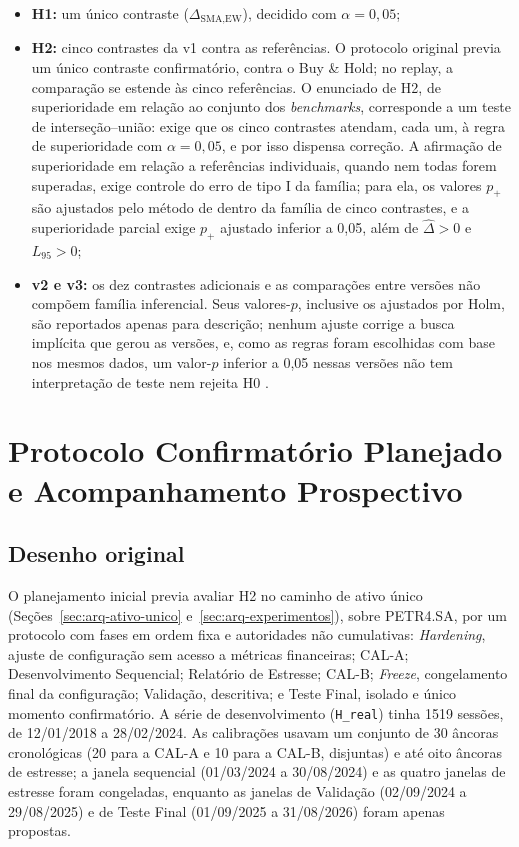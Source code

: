 \documentclass{eic-bcc-tcc}
\begin{document}
\begin{itemize}
    \item \textbf{H1:} um único contraste ($\Delta_{\text{SMA},\text{EW}}$), decidido com $\alpha = 0{,}05$;
    \item \textbf{H2:} cinco contrastes da v1 contra as referências. O protocolo original previa um único contraste confirmatório, contra o Buy \& Hold; no replay, a comparação se estende às cinco referências. O enunciado de H2, de superioridade em relação ao conjunto dos \textit{benchmarks}, corresponde a um teste de interseção--união: exige que os cinco contrastes atendam, cada um, à regra de superioridade com $\alpha = 0{,}05$, e por isso dispensa correção. A afirmação de superioridade em relação a referências individuais, quando nem todas forem superadas, exige controle do erro de tipo I da família; para ela, os valores $p_{+}$ são ajustados pelo método de \citet{Holm1979} dentro da família de cinco contrastes, e a superioridade parcial exige $p_{+}$ ajustado inferior a 0,05, além de $\hat{\Delta} > 0$ e $L_{95} > 0$;
    \item \textbf{v2 e v3:} os dez contrastes adicionais e as comparações entre versões não compõem família inferencial. Seus valores-$p$, inclusive os ajustados por Holm, são reportados apenas para descrição; nenhum ajuste corrige a busca implícita que gerou as versões, e, como as regras foram escolhidas com base nos mesmos dados, um valor-$p$ inferior a 0,05 nessas versões não tem interpretação de teste nem rejeita H0 \citep{White2000, Bailey2017}.
\end{itemize}


\section{Protocolo Confirmatório Planejado e Acompanhamento Prospectivo}
\label{sec:met-protocolo}

\subsection{Desenho original}

O planejamento inicial previa avaliar H2 no caminho de ativo único (Seções~\ref{sec:arq-ativo-unico} e~\ref{sec:arq-experimentos}), sobre PETR4.SA, por um protocolo com fases em ordem fixa e autoridades não cumulativas: \textit{Hardening}, ajuste de configuração sem acesso a métricas financeiras; CAL-A; Desenvolvimento Sequencial; Relatório de Estresse; CAL-B; \textit{Freeze}, congelamento final da configuração; Validação, descritiva; e Teste Final, isolado e único momento confirmatório. A série de desenvolvimento (\texttt{H\_real}) tinha 1519 sessões, de 12/01/2018 a 28/02/2024. As calibrações usavam um conjunto de 30 âncoras cronológicas (20 para a CAL-A e 10 para a CAL-B, disjuntas) e até oito âncoras de estresse; a janela sequencial (01/03/2024 a 30/08/2024) e as quatro janelas de estresse foram congeladas, enquanto as janelas de Validação (02/09/2024 a 29/08/2025) e de Teste Final (01/09/2025 a 31/08/2026) foram apenas propostas.
\end{document}
